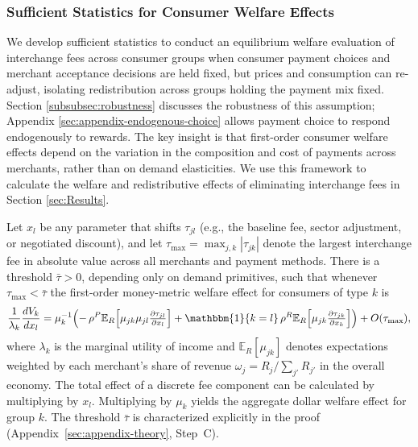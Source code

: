 \documentclass[main.tex]{subfiles}
\begin{document}
\subsubsection{Sufficient Statistics for Consumer Welfare Effects}

We develop sufficient statistics to conduct an equilibrium welfare evaluation of interchange fees across consumer groups when consumer payment choices and merchant acceptance decisions are held fixed, but prices and consumption can re-adjust, isolating redistribution across groups holding the payment mix fixed.
Section \ref{subsubsec:robustness} discusses the robustness of this assumption; Appendix \ref{sec:appendix-endogenous-choice} allows payment choice to respond endogenously to rewards.
The key insight is that first-order consumer welfare effects depend on the variation in the composition and cost of payments across merchants, rather than on demand elasticities. We use this framework to calculate the welfare and redistributive effects of eliminating interchange fees in Section \ref{sec:Results}.

\begin{theorem}\label{thm:sufficient-stat}
Let $x_l$ be any parameter that shifts $\tau_{jl}$ (e.g., the baseline fee, sector adjustment, or negotiated discount), and let $\tau_{\max}=\max_{j,k}|\tau_{jk}|$ denote the largest interchange fee in absolute value across all merchants and payment methods.
There is a threshold $\bar\tau>0$, depending only on demand primitives, such that whenever $\tau_{\max}<\bar\tau$ the first-order money-metric welfare effect for consumers of type $k$ is
\begin{equation}
\frac{1}{\lambda_k}\frac{dV_k}{dx_l}
= \mu_k^{-1}\!\left(
-\,\rho^P \mathbb{E}_R\!\left[\mu_{jk}\mu_{jl}\tfrac{\partial\tau_{jl}}{\partial x_l}\right]
+ \mathbbm{1}\{k=l\}\,\rho^R \mathbb{E}_R\!\left[\mu_{jk}\tfrac{\partial\tau_{jk}}{\partial x_k}\right]
\right) + O(\tau_{\max}),\label{eq:sufficient-stat-formula}
\end{equation}
where $\lambda_k$ is the marginal utility of income and $\mathbb{E}_R\!\left[\mu_{jk}\right]$ denotes expectations weighted by each merchant's share of revenue $\omega_j = R_j / \sum_{j'} R_{j'}$ in the overall economy.
The total effect of a discrete fee component can be calculated by multiplying by $x_l$.
Multiplying by $\mu_k$ yields the aggregate dollar welfare effect for group $k$.
The threshold $\bar\tau$ is characterized explicitly in the proof (Appendix~\ref{sec:appendix-theory}, Step~C).

\end{theorem}
\end{document}
